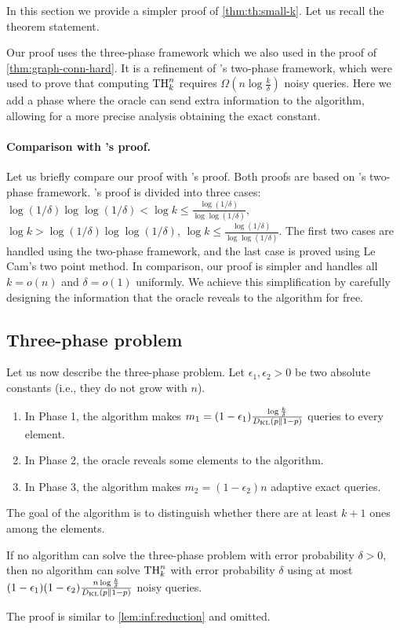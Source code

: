 In this section we provide a simpler proof of \cref{thm:th:small-k}. Let us recall the theorem statement.

\ThresholdSmallK*

Our proof uses the three-phase framework which we also used in the proof of \cref{thm:graph-conn-hard}. It is a refinement of \cite{feige1994computing}'s two-phase framework, which were used to prove that computing $\Threshold{n}{k}$ requires $\Omega\left(n \log \frac k\delta\right)$ noisy queries.
Here we add a phase where the oracle can send extra information to the algorithm, allowing for a more precise analysis obtaining the exact constant.

\paragraph{Comparison with \cite{wang2024noisy}'s proof.}
Let us briefly compare our proof with \cite{wang2024noisy}'s proof. Both proofs are based on \cite{feige1994computing}'s two-phase framework.
\cite{wang2024noisy}'s proof is divided into three cases: $\log(1/\delta)\log\log(1/\delta) < \log k \le \frac{\log(1/\delta)}{\log\log(1/\delta)}$, $\log k > \log(1/\delta)\log\log(1/\delta)$, $\log k \le \frac{\log(1/\delta)}{\log\log(1/\delta)}$.
The first two cases are handled using the two-phase framework, and the last case is proved using Le Cam's two point method.
In comparison, our proof is simpler and handles all $k=o(n)$ and $\delta = o(1)$ uniformly. We achieve this simplification by carefully designing the information that the oracle reveals to the algorithm for free.

\subsection{Three-phase problem} \label{sec:th-small:three-phase}
Let us now describe the three-phase problem. Let $\epsilon_1,\epsilon_2>0$ be two absolute constants (i.e., they do not grow with $n$).
\begin{enumerate}
  \item In Phase 1, the algorithm makes $m_1 = (1-\epsilon_1) \frac{\log \frac k\delta}{\DKL}$ queries to every element.
  \item In Phase 2, the oracle reveals some elements to the algorithm.
  \item In Phase 3, the algorithm makes $m_2 = (1-\epsilon_2) n$ adaptive exact queries.
\end{enumerate}
The goal of the algorithm is to distinguish whether there are at least $k+1$ ones among the elements.
\begin{lemma} \label{lem:th:reduction}
  If no algorithm can solve the three-phase problem with error probability $\delta>0$, then no algorithm can solve $\Threshold{n}{k}$ with error probability $\delta$ using at most $(1-\epsilon_1)(1-\epsilon_2) \frac{n \log \frac k\delta}{\DKL}$ noisy queries.
\end{lemma}
The proof is similar to \cref{lem:inf:reduction} and omitted.


